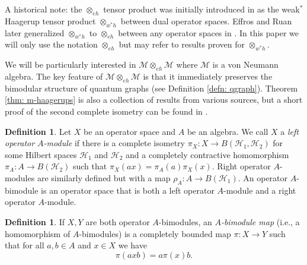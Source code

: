 \documentclass[12pt]{article}
\theoremstyle{definition}
\newtheorem{definition}[theorem]{Definition}
\newenvironment{remark}
  {\pushQED{\qed}\renewcommand{\qedsymbol}{\textcircled{\tiny R}}\remarkx}
  {\popQED\endremarkx}
\newcommand{\mc}[1]{\mathcal{#1}}
\newcommand{\<}{\langle}
\renewcommand{\>}{\rangle}
\newcommand{\eh}{\otimes_{eh}}
\begin{document}
\begin{remark}
    A historical note: the $\otimes_{eh}$ tensor product was initially introduced in \cite{blecher-smith-w*h} as the weak$^*$ Haagerup tensor product $\otimes_{w^*h}$ between dual operator spaces. Effros and Ruan later generalized $\otimes_{w^*h}$ to $\otimes_{eh}$ between any operator spaces in \cite{opsp-hopf}. In this paper we will only use the notation $\otimes_{eh}$ but may refer to results proven for $\otimes_{w^*h}$.
\end{remark}

We will be particularly interested in $\mc M \otimes_{eh} \mc M$ where $\mc M$ is a von Neumann algebra. The key feature of $\mc M \eh \mc M$ is that it immediately preserves the bimodular structure of quantum graphs (see Definition \ref{defn: qgraph}). Theorem \ref{thm: m-haagerups} is also a collection of results from various sources, but a short proof of the second complete isometry can be found in \cite[Theorem 2.2]{gp-obs}.

\begin{definition} \cite[3.1.1]{blecher-lemerdy} \label{defn: op-modules}
    Let $X$ be an operator space and $A$ be an algebra. We call $X$ a \textit{left operator $A$-module} if there is a complete isometry $\pi_X: X \to B(\mc H_1, \mc H_2)$ for some Hilbert spaces $\mc H_1$ and $\mc H_2$ and a completely contractive homomorphism $\pi_A: A \to B(\mc H_2)$ such that $\pi_X(ax) = \pi_A(a) \pi_X(x)$. Right operator $A$-modules are similarly defined but with a map $\rho_A: A \to B(\mc H_1)$. An operator $A$-bimodule is an operator space that is both a left operator $A$-module and a right operator $A$-module.
\end{definition}

\begin{definition} \label{defn: bimod map}
    If $X,Y$ are both operator $A$-bimodules, an \textit{$A$-bimodule map} (i.e., a homomorphism of $A$-bimodules) is a completely bounded map $\pi: X \to Y$ such that for all $a,b \in A$ and $x \in X$ we have
    \[
    \pi(axb) = a \pi(x) b.
    \]
\end{definition}
\end{document}
